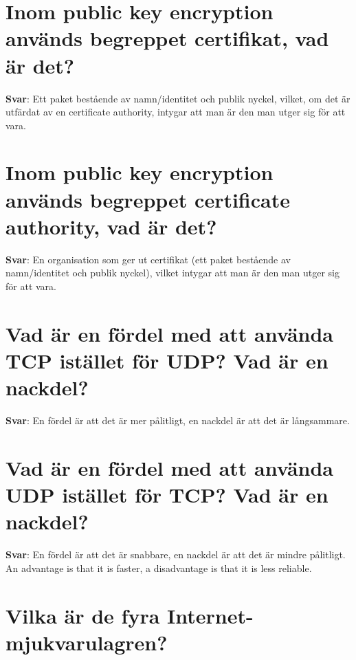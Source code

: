 \documentclass[a4paper,11pt,oneside]{book}
\begin{document}
\begin{sloppypar}
\section{Inom public key encryption anv\"ands begreppet certifikat, vad \"ar det?}

\label{q:161:sa:sv:True}

\textbf{Svar}: Ett paket best\r{a}ende av namn/identitet och publik nyckel, vilket, om det \"ar utf\"ardat av en certificate authority, intygar att man \"ar den man utger sig f\"or att vara.



\section{Inom public key encryption anv\"ands begreppet certificate authority, vad \"ar det?}

\label{q:162:sa:sv:True}

\textbf{Svar}: En organisation som ger ut certifikat (ett paket best\r{a}ende av namn/identitet och publik nyckel), vilket intygar att man \"ar den man utger sig f\"or att vara.



\section{Vad \"ar en f\"ordel med att anv\"anda TCP ist\"allet f\"or UDP? Vad \"ar en nackdel?}

\label{q:163:sa:sv:True}

\textbf{Svar}: En f\"ordel \"ar att det \"ar mer p\r{a}litligt, en nackdel \"ar att det \"ar l\r{a}ngsammare.



\section{Vad \"ar en f\"ordel med att anv\"anda UDP ist\"allet f\"or TCP? Vad \"ar en nackdel?}

\label{q:164:sa:sv:True}

\textbf{Svar}: En f\"ordel \"ar att det \"ar snabbare, en nackdel \"ar att det \"ar mindre p\r{a}litligt. An advantage is that it is faster, a disadvantage is that it is less reliable.



\section{Vilka \"ar de fyra Internet-mjukvarulagren?}


\end{sloppypar}
\end{document}
